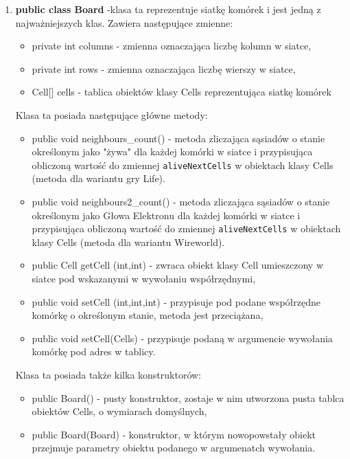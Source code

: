 \documentclass[10pt, oneside]{article}
\begin{document}
\begin {enumerate}
\item  \textbf{ public class Board} -klasa ta reprezentuje siatkę komórek i jest jedną z najważniejszych klas. Zawiera następujące zmienne:
\begin{itemize}
	\item private int columns - zmienna oznaczająca liczbę kolumn w siatce,
	\item private int rows - zmienna oznaczająca liczbę wierszy w siatce,
	\item Cell[] cells - tablica obiektów klasy Cells reprezentująca siatkę komórek
\end{itemize}
 
Klasa ta posiada następujące główne metody:
\begin {itemize}
	\item public void neighbours\_count()  - metoda zliczająca sąsiadów o stanie określonym jako "żywa" dla każdej komórki w siatce i przypisująca obliczoną wartość do zmiennej \texttt{aliveNextCells} w obiektach klasy Cells (metoda dla wariantu gry Life).
		\item public void neighbours2\_count()  - metoda zliczająca sąsiadów o stanie określonym jako Głowa Elektronu dla każdej komórki w siatce i przypisująca obliczoną wartość do zmiennej \texttt{aliveNextCells} w obiektach klasy Cells (metoda dla wariantu Wireworld).
	\item public Cell getCell (int,int) - zwraca obiekt klasy Cell umieszczony w siatce pod wskazanymi w wywołaniu współrzędnymi,
	\item public void setCell (int,int,int) - przypisuje pod podane współrzędne komórkę o określonym stanie, metoda jest przeciążana,
	\item public void setCell(Cells) - przypisuje podaną w argumencie wywołania komórkę pod adres w tablicy.
\end{itemize}	
	
Klasa ta posiada także kilka konstruktorów:
\begin {itemize}
\item public Board() - pusty konstruktor, zostaje w nim utworzona pusta tablca obiektów Cells, o wymiarach domyślnych,
\item public Board(Board) - konstruktor, w którym nowopowstały obiekt przejmuje parametry obiektu podanego w argumenatch wywołania.
\end{itemize}
\end{enumerate}
\end{document}
